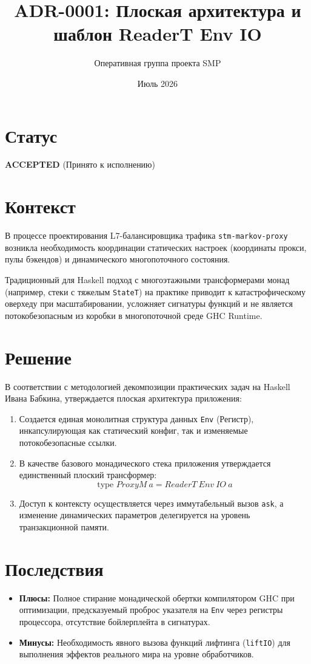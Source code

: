 \documentclass{article}
\title{ADR-0001: Плоская архитектура и шаблон ReaderT Env IO}
\author{Оперативная группа проекта SMP}
\date{Июль 2026}
\begin{document}
\maketitle

\section*{Статус}
\textbf{ACCEPTED} (Принято к исполнению)

\section*{Контекст}
В процессе проектирования L7-балансировщика трафика \texttt{stm-markov-proxy} возникла необходимость координации статических настроек (координаты прокси, пулы бэкендов) и динамического многопоточного состояния. 

Традиционный для Haskell подход с многоэтажными трансформерами монад (например, стеки с тяжелым \texttt{StateT}) на практике приводит к катастрофическому оверхеду при масштабировании, усложняет сигнатуры функций и не является потокобезопасным из коробки в многопоточной среде GHC Runtime.

\section*{Решение}
В соответствии с методологией декомпозиции практических задач на Haskell Ивана Бабкина, утверждается плоская архитектура приложения:
\begin{enumerate}
    \item Создается единая монолитная структура данных \texttt{Env} (Регистр), инкапсулирующая как статический конфиг, так и изменяемые потокобезопасные ссылки.
    \item В качестве базового монадического стека приложения утверждается единственный плоский трансформер:
    \[ \text{type } ProxyM\ a = ReaderT\ Env\ IO\ a \]
    \item Доступ к контексту осуществляется через иммутабельный вызов \texttt{ask}, а изменение динамических параметров делегируется на уровень транзакционной памяти.
\end{enumerate}

\section*{Последствия}
\begin{itemize}
    \item \textbf{Плюсы:} Полное стирание монадической обертки компилятором GHC при оптимизации, предсказуемый проброс указателя на \texttt{Env} через регистры процессора, отсутствие бойлерплейта в сигнатурах.
    \item \textbf{Минусы:} Необходимость явного вызова функций лифтинга (\texttt{liftIO}) для выполнения эффектов реального мира на уровне обработчиков.
\end{itemize}
\end{document}
